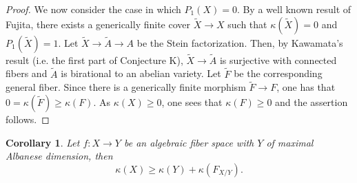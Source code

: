 \documentclass[10pt, a4paper]{amsart}
\newtheorem{lem}[thm]{Lemma}
\newtheorem{cor}[thm]{Corollary}
\newcommand\lra{\longrightarrow}
\begin{document}
\begin{proof}
We now consider the case in which $P_1(X)=0$.
By a well known result of Fujita,
there exists a generically finite cover 
$\tilde{X}\lra X$ such that $\kappa (\tilde{X})
=0$ and $P_1(\tilde {X})=1$.
Let $\tilde{X}\lra \tilde {A}\lra {A}$ be the Stein factorization.
Then, by Kawamata's result (i.e. the first part of Conjecture K), 
$\tilde{X}\lra \tilde {A}$
is surjective with connected fibers and $\tilde {A}$ is birational to
an abelian variety. Let $\tilde{F}$ be the corresponding general fiber.
Since there is a generically finite morphism $\tilde{F}\lra F$, one has that
$0=\kappa (\tilde {F})\geq \kappa (F)$. As $\kappa (X)\geq 0$, one sees that
$\kappa (F)\geq 0$ and the assertion follows.
\end{proof}
\begin{cor} Let $f:X\lra Y$ be an algebraic fiber space with $Y$ of maximal
Albanese dimension, then
$$\kappa(X)\geq \kappa (Y)+\kappa (F_{X/Y}).$$
\end{cor}
\end{document}
